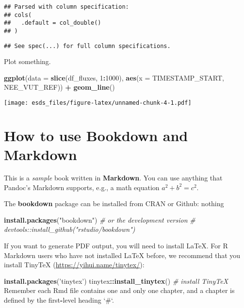 \documentclass[]{book}
\newenvironment{Shaded}{\begin{snugshade}}{\end{snugshade}}
\newcommand{\CommentTok}[1]{\textcolor[rgb]{0.56,0.35,0.01}{\textit{#1}}}
\newcommand{\DataTypeTok}[1]{\textcolor[rgb]{0.13,0.29,0.53}{#1}}
\newcommand{\DecValTok}[1]{\textcolor[rgb]{0.00,0.00,0.81}{#1}}
\newcommand{\KeywordTok}[1]{\textcolor[rgb]{0.13,0.29,0.53}{\textbf{#1}}}
\newcommand{\NormalTok}[1]{#1}
\newcommand{\OperatorTok}[1]{\textcolor[rgb]{0.81,0.36,0.00}{\textbf{#1}}}
\newcommand{\StringTok}[1]{\textcolor[rgb]{0.31,0.60,0.02}{#1}}
\begin{document}
\begin{verbatim}
## Parsed with column specification:
## cols(
##   .default = col_double()
## )
\end{verbatim}

\begin{verbatim}
## See spec(...) for full column specifications.
\end{verbatim}

Plot something.

\begin{Shaded}
\begin{Highlighting}[]
\KeywordTok{ggplot}\NormalTok{(}\DataTypeTok{data =} \KeywordTok{slice}\NormalTok{(df_fluxes, }\DecValTok{1}\OperatorTok{:}\DecValTok{1000}\NormalTok{), }\KeywordTok{aes}\NormalTok{(}\DataTypeTok{x =}\NormalTok{ TIMESTAMP_START, NEE_VUT_REF)) }\OperatorTok{+}
\StringTok{  }\KeywordTok{geom_line}\NormalTok{()}
\end{Highlighting}
\end{Shaded}

\texttt{[image: esds\_files/figure-latex/unnamed-chunk-4-1.pdf]}

\hypertarget{how-to-use-bookdown-and-markdown}{%
\section{How to use Bookdown and Markdown}\label{how-to-use-bookdown-and-markdown}}

This is a \emph{sample} book written in \textbf{Markdown}. You can use anything that Pandoc's Markdown supports, e.g., a math equation \(a^2 + b^2 = c^2\).

The \textbf{bookdown} package can be installed from CRAN or Github:
nothing

\begin{Shaded}
\begin{Highlighting}[]
\KeywordTok{install.packages}\NormalTok{(}\StringTok{"bookdown"}\NormalTok{)}
\CommentTok{# or the development version}
\CommentTok{# devtools::install_github("rstudio/bookdown")}
\end{Highlighting}
\end{Shaded}

If you want to generate PDF output, you will need to install LaTeX. For R Markdown users who have not installed LaTeX before, we recommend that you install TinyTeX (\url{https://yihui.name/tinytex/}):

\begin{Shaded}
\begin{Highlighting}[]
\KeywordTok{install.packages}\NormalTok{(}\StringTok{'tinytex'}\NormalTok{)}
\NormalTok{tinytex}\OperatorTok{::}\KeywordTok{install_tinytex}\NormalTok{()  }\CommentTok{# install TinyTeX}
\NormalTok{Remember each Rmd file contains one and only one chapter, and a chapter is defined by the first}\OperatorTok{-}\NormalTok{level heading }\StringTok{`}\DataTypeTok{#}\StringTok{`}\NormalTok{.}
\end{Highlighting}
\end{Shaded}
\end{document}

